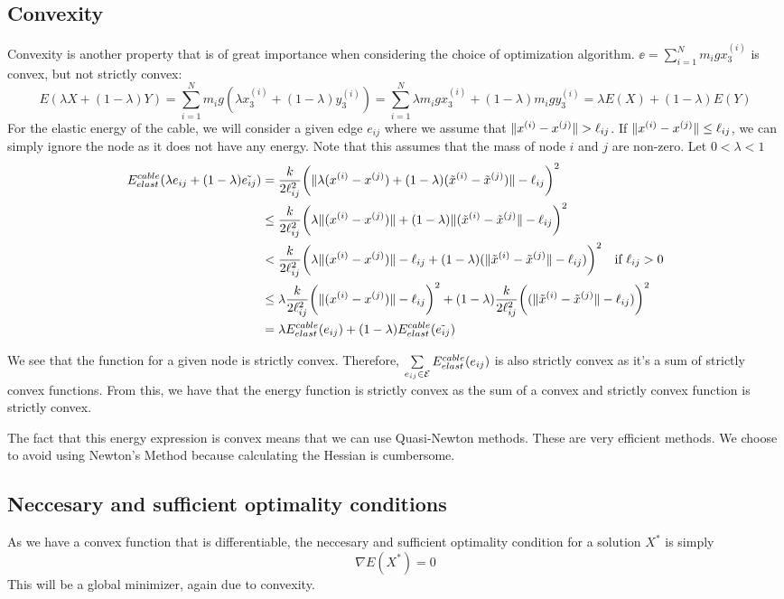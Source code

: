 \subsection{Convexity}

Convexity is another property that is of great importance when considering the choice of optimization algorithm.  $\ee =\sum_{i=1}^N m_i g x_3^{(i)}$ is convex, but not strictly convex:
\begin{equation*}
    E(\lambda X +(1-\lambda) Y) = \sum_{i=1}^N m_i g (\lambda x_3^{(i)} + (1-\lambda) y_3^{(i)})
    =\sum_{i=1}^N \lambda m_i g x_3^{(i)} + (1-\lambda) m_i g  y_3^{(i)} = \lambda E(X) + (1-\lambda) E(Y)
\end{equation*}
For the elastic energy of the cable, we will consider a given edge $e_{ij}$ where we assume that $\lVert x^{(i)} - x^{(j)}\rVert > \ell_{ij}$. If $\lVert x^{(i)} - x^{(j)}\rVert \leq \ell_{ij}$, we can simply ignore the node as it does not have any energy. Note that this assumes that the mass of node $i$ and $j$ are non-zero. Let $0 < \lambda < 1$
\begin{align*}
     E^{cable}_{elast}(\lambda e_{ij} + (1-\lambda) \tilde{e_{ij}}) &= \frac{k}{2 \ell_{ij}^2} \bigg( \lVert \lambda(x^{(i)}-x^{(j)}) + ( 1-\lambda ) (\tilde{x}^{(i)}-\tilde{x}^{(j)} )\rVert -\ell_{ij}\bigg)^2\\ &\leq \frac{k}{2 \ell_{ij}^2} \bigg( \lambda \lVert (x^{(i)}-x^{(j)}) \rVert +( 1-\lambda ) \lVert (\tilde{x}^{(i)}-\tilde{x}^{(j)} \rVert -\ell_{ij}\bigg)^2 \\ &<
     \frac{k}{2 \ell_{ij}^2}\bigg( \lambda\lVert  (x^{(i)}-x^{(j)}) \rVert - \ell_{ij} +( 1-\lambda ) ( \lVert \tilde{x}^{(i)}-\tilde{x}^{(j)} \rVert -\ell_{ij} ) \bigg)^2 \quad \text{if $\ell_{ij} > 0$} \\
     &\leq \lambda \frac{k}{2 \ell_{ij}^2}\bigg( \lVert  (x^{(i)}-x^{(j)}) \rVert - \ell_{ij} \bigg)^2 + ( 1-\lambda )\frac{k}{2 \ell_{ij}^2}\bigg( ( \lVert \tilde{x}^{(i)}-\tilde{x}^{(j)} \rVert -\ell_{ij} ) \bigg)^2 \\&= \lambda E^{cable}_{elast}(e_{ij}) + (1-\lambda) E^{cable}_{elast}(\Tilde{e_{ij}})
\end{align*}

We see that the function for a given node is strictly convex. Therefore, $\sum\limits_{e_{ij} \in \mathcal{E}} E^{cable}_{elast}(e_{ij})$ is also strictly convex as it's a sum of strictly convex functions. From this, we have that the energy function is strictly convex as the sum of a convex and strictly convex function is strictly convex. 

The fact that this energy expression is convex means that we can use Quasi-Newton methods. These are very efficient methods. We choose to avoid using Newton's Method because calculating the Hessian is cumbersome.

\subsection{Neccesary and sufficient optimality conditions}
As we have a convex function that is differentiable, the neccesary and sufficient optimality condition for a solution $X^*$ is simply \begin{equation}
    \nabla E(X^*) = 0
\end{equation}
This will be a global minimizer, again due to convexity.